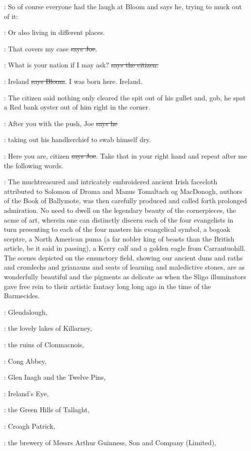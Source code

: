 \Nq:
So of course everyone had the laugh at Bloom and says he, trying to
muck out of it:

\Bloom:
Or also living in different places.

\joe:
That covers my case \sout{says Joe}.

\citizen:
What is your nation if I may ask?
\sout{says the citizen.}

\Bloom:
Ireland \sout{says Bloom}.
I was born here. Ireland.

\Nq:
The citizen said nothing only cleared the spit out of his gullet and,
gob, he spat a Red bank oyster out of him right in the corner.

\citizen:
After you with the push, Joe \sout{says he}

\Nq:
taking out his handkerchief to
swab himself dry.

\joe:
Here you are, citizen \sout{says Joe}.
Take that in your right hand and repeat
after me the following words.

:
The muchtreasured and intricately embroidered ancient Irish
facecloth attributed to Solomon of Droma and Manus Tomaltach og
MacDonogh, authors of the Book of Ballymote, was then carefully
produced and called forth prolonged admiration. No need to dwell on the
legendary beauty of the cornerpieces, the acme of art, wherein one can
distinctly discern each of the four evangelists in turn presenting to each
of the four masters his evangelical symbol, a bogoak sceptre, a North
American puma (a far nobler king of beasts than the British article, be it
said in passing), a Kerry calf and a golden eagle from Carrantuohill. The
scenes depicted on the emunctory field, showing our ancient duns and raths
and cromlechs and grianauns and seats of learning and maledictive stones,
are as wonderfully beautiful and the pigments as delicate as when the
Sligo illuminators gave free rein to their artistic fantasy long long ago
in the time of the Barmecides.

:
Glendalough,

:
the lovely lakes of Killarney,

:
the ruins of Clonmacnois,

:
Cong Abbey,

:
Glen Inagh and the Twelve Pins,

:
Ireland's Eye,

:
the Green Hills of Tallaght,

:
Croagh Patrick,

:
the brewery of Messrs Arthur Guinness, Son and Company (Limited),

